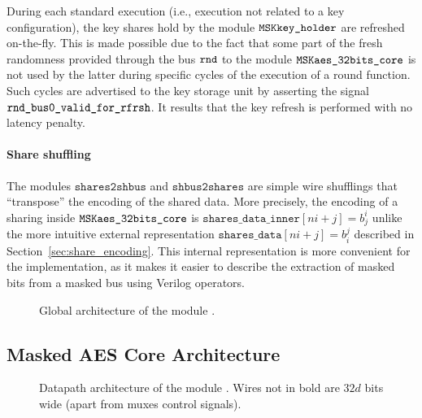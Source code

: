 \documentclass{scrartcl}
\begin{document}
During each standard execution (i.e., execution not related to a key
configuration), the key shares hold by the module $\texttt{MSKkey\_holder}$ are refreshed
on-the-fly. This is made possible due to the fact that some part of the fresh
randomness provided through the bus $\texttt{rnd}$ to the module $\texttt{MSKaes\_32bits\_core}$ is
not used by the latter during specific cycles of the execution of a round
function. Such cycles are advertised to the key storage unit by asserting the signal
$\texttt{rnd\_bus0\_valid\_for\_rfrsh}$. It results that the key refresh is performed with no latency penalty.  

\paragraph{Share shuffling}
The modules $\texttt{shares2shbus}$ and $\texttt{shbus2shares}$ are simple wire
shufflings that ``transpose'' the encoding of the shared data.
More precisely, the encoding of a sharing inside $\texttt{MSKaes\_32bits\_core}$
is $\texttt{shares\_data\_inner}\left[ ni+j\right] = b_j^i$ unlike the more
intuitive external representation $\texttt{shares\_data}\left[ ni+j\right] =
b_i^j$ described in Section~\ref{sec:share_encoding}.
This internal representation is more convenient for the implementation, as it
makes it easier to describe the extraction of masked bits from a masked bus
using Verilog operators.

\begin{figure}
    \centering
    \resizebox{\textwidth}{!}{
        \begin{tikzpicture}
            
        \end{tikzpicture}
    }
    \caption{Global architecture of the module \topName.}
    \label{fig:smaesh_top_module}
\end{figure}


\subsection{Masked AES Core Architecture} 
\label{section:masked_aes_core_arhcitecture}

\begin{figure}
    \centering
    \resizebox{\textwidth}{!}{
        \begin{tikzpicture}
            
        \end{tikzpicture}
    }
    \caption{Datapath architecture of the module \topModAES. Wires not in bold are $32d$ bits wide (apart from muxes control signals).}
    \label{fig:aes_glob_arch}
\end{figure}
\end{document}
